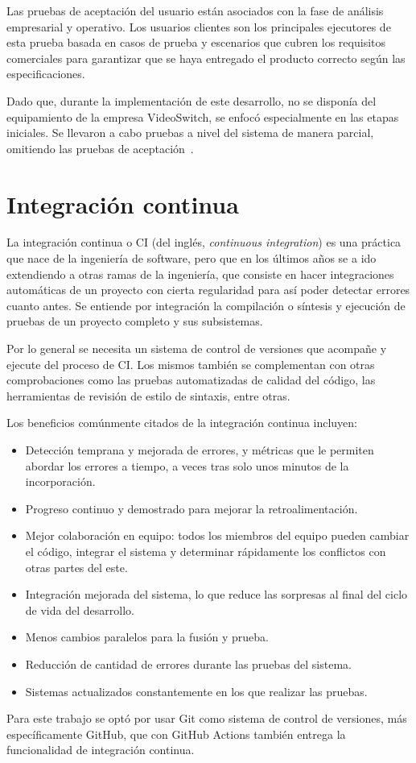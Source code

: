 Las pruebas de aceptación del usuario están asociados con la fase de
análisis empresarial y operativo. Los usuarios clientes son los principales
ejecutores de esta prueba basada en casos de prueba y escenarios que cubren los
requisitos comerciales para garantizar que se haya entregado el producto correcto
según las especificaciones.

Dado que, durante la implementación de este desarrollo, no se disponía del
equipamiento de la empresa VideoSwitch, se enfocó especialmente en las etapas
iniciales. Se llevaron a cabo pruebas a nivel del sistema de manera parcial,
omitiendo las pruebas de aceptación~\citep{testbench}.


\section{Integración continua}

La integración continua o CI (del inglés, \textit{continuous integration}) es una
práctica que nace de la ingeniería de software, pero que en los últimos años se
a ido extendiendo a otras ramas de la ingeniería, que consiste en hacer
integraciones automáticas de un proyecto con cierta regularidad para así poder
detectar errores cuanto antes. Se entiende por integración la compilación o
síntesis y ejecución de pruebas de un proyecto completo y sus subsistemas. 

Por lo general se necesita un sistema de control de versiones que acompañe y
ejecute del proceso de CI\@. Los mismos también se complementan con otras
comprobaciones como las pruebas automatizadas de calidad del código, las
herramientas de revisión de estilo de sintaxis, entre otras.

Los beneficios comúnmente citados de la integración continua incluyen:
\begin{itemize}
  \item Detección temprana y mejorada de errores, y métricas que le permiten
  abordar los errores a tiempo, a veces tras solo unos minutos de la incorporación.
  \item Progreso continuo y demostrado para mejorar la retroalimentación.
  \item Mejor colaboración en equipo: todos los miembros del equipo pueden 
  cambiar el código, integrar el sistema y determinar rápidamente los conflictos
  con otras partes del este.
  \item Integración mejorada del sistema, lo que reduce las sorpresas al final
  del ciclo de vida del desarrollo.
  \item Menos cambios paralelos para la fusión y prueba.
  \item Reducción de cantidad de errores durante las pruebas del sistema.
  \item Sistemas actualizados constantemente en los que realizar las pruebas.
\end{itemize}

Para este trabajo se optó por usar Git como sistema de control de
versiones, más específicamente GitHub, que con GitHub Actions también entrega
la funcionalidad de integración continua.